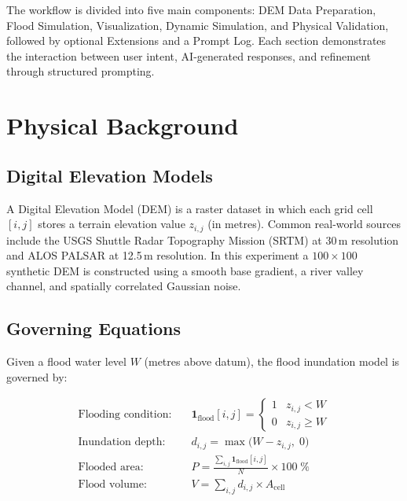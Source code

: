 \documentclass[12pt, a4paper]{article}
\begin{document}
The workflow is divided into five main components: DEM Data Preparation, Flood Simulation, Visualization, Dynamic Simulation, and Physical Validation, followed by optional Extensions and a Prompt Log. Each section demonstrates the interaction between user intent, AI-generated responses, and refinement through structured prompting.

\section{Physical Background}

\subsection{Digital Elevation Models}

A Digital Elevation Model (DEM) is a raster dataset in which each grid cell $[i,j]$ stores a terrain elevation value $z_{i,j}$ (in metres). Common real-world sources include the USGS Shuttle Radar Topography Mission (SRTM) at 30\,m resolution and ALOS PALSAR at 12.5\,m resolution. In this experiment a $100 \times 100$ synthetic DEM is constructed using a smooth base gradient, a river valley channel, and spatially correlated Gaussian noise.

\subsection{Governing Equations}

Given a flood water level $W$ (metres above datum), the flood inundation model is governed by:

\begin{align}
  \text{Flooding condition:}\quad
    & \mathbf{1}_{\text{flood}}[i,j] =
      \begin{cases} 1 & z_{i,j} < W \\ 0 & z_{i,j} \geq W \end{cases} \\[6pt]
  \text{Inundation depth:}\quad
    & d_{i,j} = \max\!\bigl(W - z_{i,j},\;0\bigr) \\[6pt]
  \text{Flooded area:}\quad
    & P = \frac{\displaystyle\sum_{i,j}\mathbf{1}_{\text{flood}}[i,j]}{N}
      \times 100\;\% \\[6pt]
  \text{Flood volume:}\quad
    & V = \sum_{i,j} d_{i,j} \times A_{\text{cell}}
\end{align}
\end{document}
